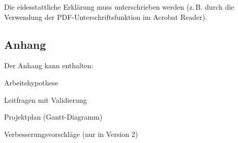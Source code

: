 Die eidesstattliche Erklärung muss unterschrieben werden (z.\,B. durch die Verwendung der PDF-Unterschriftsfunktion im Acrobat Reader).

\subsection{Anhang}
\label{subsec:anhang_struktur}

Der Anhang kann enthalten:
\begin{listenabsatz}
	\item Arbeitshypothese
	\item Leitfragen mit Validierung
	\item Projektplan (Gantt-Diagramm)
	\item Verbesserungsvorschläge (nur in Version 2)
\end{listenabsatz}

